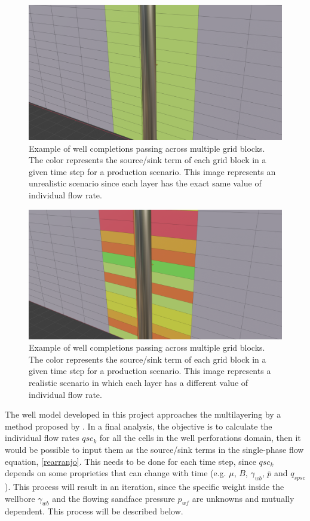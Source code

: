 \begin{figure}[H]
	\centering
	\includegraphics[width=0.8\linewidth]{Images/multilayering}
	\caption{Example of well completions passing across multiple grid blocks. The color represents the source/sink term of each grid block in a given time step for a production scenario. This image represents an unrealistic scenario since each layer has the exact same value of individual flow rate.}
	\label{fig:multilayering}
\end{figure}
\begin{figure}[h]
	\centering
	\includegraphics[width=0.8\linewidth]{Images/multilayering2}
	\caption{Example of well completions passing across multiple grid blocks. The color represents the source/sink term of each grid block in a given time step for a production scenario. This image represents a realistic scenario in which each layer has a different value of individual flow rate.}
	\label{fig:multilayering2}
\end{figure}
The well model developed in this project approaches the multilayering by a method proposed by \cite{Ertekin2001}. In a final analysis, the objective is to calculate the individual flow rates $q{sc_k}$ for all the cells in the well perforations domain, then it would be possible to input them as the source/sink terms in the single-phase flow equation, \ref{rearranjo}. This needs to be done for each time step, since $q{sc_k}$ depends on some proprieties that can change with time (e.g. $\mu$, $B$, $\gamma_{wb}$, $\bar{p}$ and $q_{spsc}$). This process will result in an iteration, since the specific weight inside the wellbore $\gamma_{wb}$ and the flowing sandface pressure $p_{wf}$ are unknowns and mutually dependent. This process will be described below.


